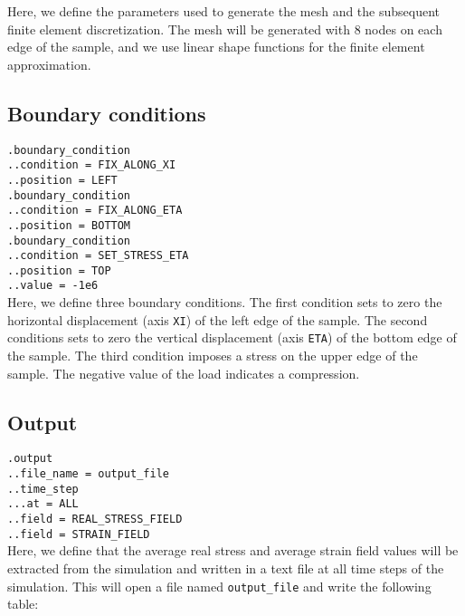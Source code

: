 \documentclass[10pt]{article}
\begin{document}
Here, we define the parameters used to generate the mesh and the subsequent finite element discretization. The mesh will be generated with 8 nodes on each edge of the sample, and we use linear shape functions for the finite element approximation.

\subsection{Boundary conditions}

\verb+.boundary_condition+\\
\verb+..condition = FIX_ALONG_XI+\\
\verb+..position = LEFT+\\
\verb+.boundary_condition+\\
\verb+..condition = FIX_ALONG_ETA+\\
\verb+..position = BOTTOM+\\
\verb+.boundary_condition+\\
\verb+..condition = SET_STRESS_ETA+\\
\verb+..position = TOP+\\
\verb+..value = -1e6+\\

Here, we define three boundary conditions. The first condition sets to zero the horizontal displacement (axis \verb+XI+) of the left edge of the sample. The second conditions sets to zero the vertical displacement (axis \verb+ETA+) of the bottom edge of the sample. The third condition imposes a stress on the upper edge of the sample. The negative value of the load indicates a compression.

\subsection{Output}

\verb+.output+\\
\verb+..file_name = output_file+\\
\verb+..time_step+\\
\verb+...at = ALL+\\
\verb+..field = REAL_STRESS_FIELD+\\
\verb+..field = STRAIN_FIELD+\\

Here, we define that the average real stress and average strain field values will be extracted from the simulation and written in a text file at all time steps of the simulation. This will open a file named \verb+output_file+ and write the following table:\\
\end{document}
